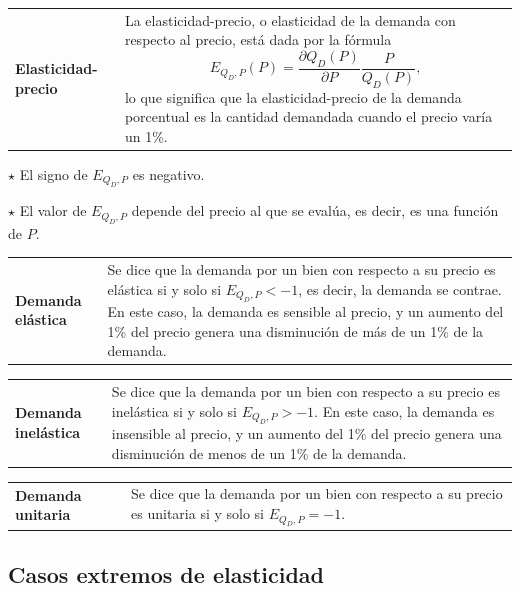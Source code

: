 \documentclass{report}
\newenvironment{obs}{$\star$ }{}
\newenvironment{definition}[1]{\begin{center}
\begin{tabular}{p{3.5cm} p{12.5cm}}
\textbf{#1} &
}
{\\ \end{tabular}\end{center}}
\begin{document}
\begin{definition}{Elasticidad-precio}
La elasticidad-precio, o elasticidad de la demanda con respecto al precio, está dada por la fórmula
$$E_{Q_D,P}\!\left(P\right)=\frac{\partial Q_D\!\left(P\right)}{\partial P}\frac{P}{Q_D\!\left(P\right)}\text{,}$$
lo que significa que la elasticidad-precio de la demanda porcentual es la cantidad demandada cuando el precio varía un 1\%.
\end{definition}

\begin{obs}
El signo de $E_{Q_D,P}$ es negativo.
\end{obs}

\begin{obs}
El valor de $E_{Q_D,P}$ depende del precio al que se evalúa, es decir, es una función de $P$.
\end{obs}

\begin{definition}{Demanda elástica}
Se dice que la demanda por un bien con respecto a su precio es elástica si y solo si $E_{Q_D,P}<-1$, es decir, la demanda se contrae. En este caso, la demanda es sensible al precio, y un aumento del 1\% del precio genera una disminución de más de un 1\% de la demanda.
\end{definition}

\begin{definition}{Demanda inelástica}
Se dice que la demanda por un bien con respecto a su precio es inelástica si y solo si $E_{Q_D,P}>-1$. En este caso, la demanda es insensible al precio, y un aumento del 1\% del precio genera una disminución de menos de un 1\% de la demanda.
\end{definition}

\begin{definition}{Demanda unitaria}
Se dice que la demanda por un bien con respecto a su precio es unitaria si y solo si $E_{Q_D,P}=-1$.
\end{definition}

\subsection{Casos extremos de elasticidad}
\end{document}
